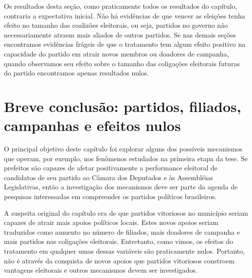 Os resultados desta seção, como praticamente todos os resultados do capítulo, contraria a expectativa inicial. Não há evidências de que vencer as eleições tenha efeito no tamanho das coalizões eleitorais, ou seja, partidos no governo não necessariamente atraem mais aliados de outros partidos. Se nas demais seções encontramos evidências frágeis de que o tratamento tem algum efeito positivo na capacidade do partido em atrair novos membros ou doadores de campanha, quando observamos seu efeito sobre o tamanho das coligações eleitorais futuras do partido encontramos apenas resultados nulos.

\section{Breve conclusão: partidos, filiados, campanhas e efeitos nulos}

O principal objetivo deste capítulo foi explorar alguns dos possíveis mecanismos que operam, por exemplo, nos fenômenos estudados na primeira etapa da tese. Se prefeitos são capazes de afetar positivamente a performance eleitoral de candidatos de seu partido ao Câmara dos Deputados e às Assembléias Legislativas, então a investigação dos mecanismos deve ser parte da agenda de pesquisas interessadas em compreender os partidos políticos brasileiros.

A suspeita original do capítulo era de que partidos vitoriosos no município seriam capazes de atrair mais apoios políticos locais. Estes novos apoios seriam traduzidos como aumento no número de filiados, mais doadores de campanha e mais partidos nas coligações eleitorais. Entretanto, como vimos, os efeitos do tratamento em qualquer umas dessas variáveis são praticamente nulos. Portanto, não é através da conquista de novos apoios que partidos vitoriosos constroem vantagens eleitorais e outros mecanismos devem ser investigados.
